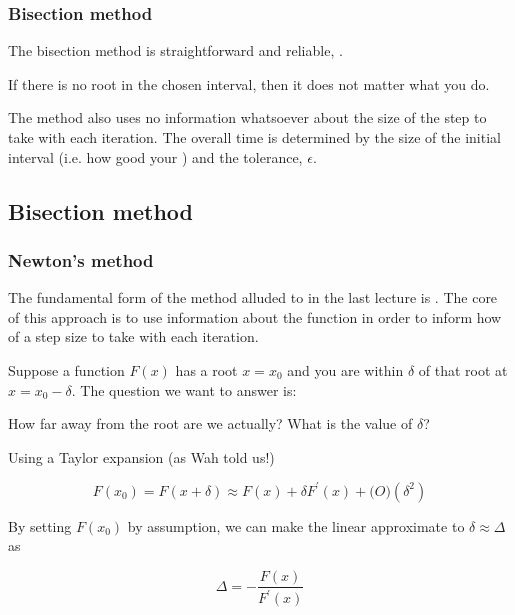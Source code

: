 \documentclass[hyperref={colorlinks=true}]{beamer}
\begin{document}
\begin{frame}%
  \frametitle{Bisection method}

  The bisection method is straightforward and reliable, .
  
  \mysp 
  
  If there is no root in the chosen interval, then it does not matter what you do.
  
  \mysp
  
  The method also uses no information whatsoever about the size of the step to take with each iteration. The overall time is determined  by the size of the initial interval (i.e. how good your ) and the tolerance, $\epsilon$.
  
  \mysp
  
  \pause
  
  \centering {}
  
\end{frame}

\subsection[Bisection method]{Bisection method}

\begin{frame}%
  \frametitle{Newton's method}

  The fundamental form of the method alluded to in the last lecture is . The core of this approach is to use information about the function in order to inform how  of a step size to take with each iteration.
  
  \mysp
  
  Suppose a function $F(x)$ has a root $ x = x_0$ and you are within $\delta$ of that root at $x = x_0 - \delta$. The question we want to answer is: 
  
  \mysp
  
  \begin{ucblock}{}
    How far away from the root are we actually? What is the value of $\delta$?
  \end{ucblock}
  
  \mysp
  
  Using a Taylor expansion (as Wah told us!) 
  
  \begin{equation}
    F(x_0) = F(x+\delta) \approx F(x) + \delta F^{\prime}(x) + \mathcal(O)(\delta^2)
  \end{equation}
  
  By setting $F(x_0)$ by assumption, we can make the linear approximate to $\delta \approx \Delta$ as
  
  \begin{equation}
    \Delta = - \frac{F(x)}{F^{\prime}(x)}
  \end{equation}
  
\end{frame}
\end{document}
